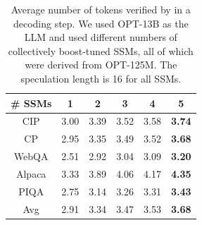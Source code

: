 \begin{table}
\caption{Average number of tokens verified by \Sys in a decoding step. We used OPT-13B as the LLM and used different numbers of collectively boost-tuned SSMs, all of which were derived from OPT-125M. The speculation length is 16 for all SSMs.}
\label{tab:cbt-opt}
\begin{center}
\footnotesize
\begin{tabular}{cccccc}
\toprule
               \# SSMs             & 1 & 2 & 3 & 4 & 5 \\ \midrule
CIP & 3.00     & 3.39     & 3.52     & 3.58     & \textbf{3.74}     \\
CP           & 2.95     & 3.35     & 3.49     & 3.52     & \textbf{3.68}     \\
WebQA                      & 2.51     & 2.92     & 3.04     & 3.09     & \textbf{3.20}     \\
Alpaca               & 3.33     & 3.89     & 4.06     & 4.17     & \textbf{4.35}     \\
PIQA                        & 2.75     & 3.14     & 3.26     & 3.31     & \textbf{3.43}     \\ \midrule
Avg                         & 2.91     & 3.34     & 3.47     & 3.53     & \textbf{3.68}     \\ \bottomrule
\end{tabular}
\end{center}
\end{table}